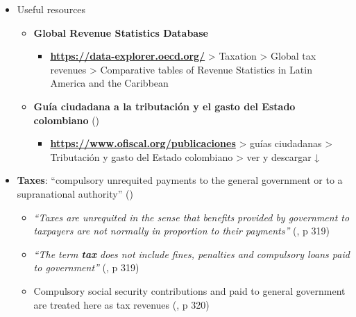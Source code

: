 \documentclass[
  ignorenonframetext,
]{beamer}
\providecommand{\tightlist}{%
  \setlength{\itemsep}{0pt}\setlength{\parskip}{0pt}}\usepackage{longtable,booktabs,array}
\begin{document}
\begin{frame}{}
\label{section-12}
\begin{itemize}
\item
  Useful resources

  \begin{itemize}
  \item
    \textbf{Global Revenue Statistics Database}

    \begin{itemize}
    \tightlist
    \item
      \href{https://data-explorer.oecd.org/}{\textbf{https://data-explorer.oecd.org/}}
      \textgreater{} Taxation \textgreater{} Global tax revenues
      \textgreater{} Comparative tables of Revenue Statistics in Latin
      America and the Caribbean
    \end{itemize}
  \item
    \textbf{Guía ciudadana a la tributación y el gasto del Estado
    colombiano}
    ()

    \begin{itemize}
    \tightlist
    \item
      \href{https://www.ofiscal.org/publicaciones}{\textbf{https://www.ofiscal.org/publicaciones}}
      \textgreater{} guías ciudadanas \textgreater{} Tributación y gasto
      del Estado colombiano \textgreater{} ver y descargar ↓
    \end{itemize}
  \end{itemize}
\end{itemize}
\end{frame}

\begin{frame}{}
\label{section-13}
\begin{itemize}
\item
  \textbf{Taxes}: ``compulsory unrequited payments to the general
  government or to a supranational authority''
  ()

  \begin{itemize}
  \item
    \emph{``Taxes are unrequited in the sense that benefits provided by
    government to taxpayers are not normally in proportion to their
    payments''} (, p 319)
  \item
    \emph{``The term \textbf{tax} does not include fines, penalties and
    compulsory loans paid to government''}
    (, p 319)
  \item
    Compulsory social security contributions and paid to general
    government are treated here as tax revenues
    (, p 320)
  \end{itemize}
\end{itemize}
\end{frame}
\end{document}
